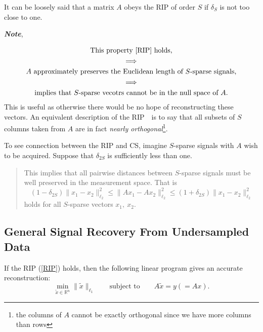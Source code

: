 It can be loosely said that a matrix $A$ \textcolor[rgb]{1,0,0}{obeys the RIP of order} $S$ if $\delta_S$ is \textcolor[rgb]{1,0,0}{not} too close to one.
\begin{center}
 \Large\textbf{\emph{\textcolor[rgb]{1,0,0}{Note}}},
\end{center}
\normalsize
\begin{align*}
\begin{gathered}
\text{This property \cref{RIP} holds,}\\
\Longrightarrow	\\
A \text{ approximately preserves the Euclidean length of $S$-sparse signals,}\\
\Longrightarrow\\
\text{implies that $S$-sparse vecotrs cannot be in the null space of $A$.}
\end{gathered}	
\end{align*}
This is useful as otherwise there would be no hope of reconstructing these vectors. An equivalent description of the RIP　is to say that all subsets of $S$ columns taken from $A$ are in fact \emph{nearly orthogonal}\footnote{the columns of $A$ cannot be exactly orthogonal since we have more columns than rows}.

To see connection between the RIP and CS, imagine $S$-sparse signals with $A$ wish to be acquired. Suppose that $\delta_{2S}$ is sufficiently less than one.
\begin{quote}
	This implies that all pairwise distances between $S$-sparse signals must be well preserved in the measurement space. That is 
	\begin{equation*}
	(1-\delta_{2S})\|x_1-x_2\|_{\ell_2}^2 \leq \|Ax_1-Ax_2\|_{\ell_2}^2 \leq (1+\delta_{2S})\|x_1-x_2\|_{\ell_2}^2
	\end{equation*}
	holds for all $S$-sparse vectors $x_1,\ x_2$.
\end{quote}





\subsection{General Signal Recovery From Undersampled Data}
If the RIP (\cref{RIP}) holds, then the following linear program gives an accurate reconstruction:
\begin{equation}
\label{eq9}
\min_{\tilde{x}\in\mathbb{R}^n}\|\tilde{x}\|_{\ell_1} \qquad \mbox{subject to} \qquad A\tilde{x}=y(=Ax).
\end{equation}

